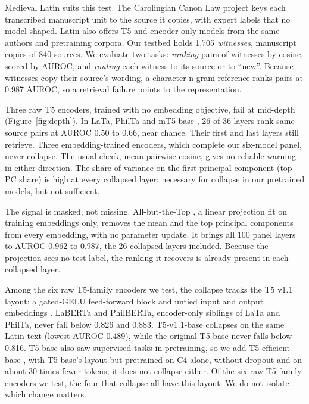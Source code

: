 \documentclass[11pt]{article}
\begin{document}
Medieval Latin suits this test.
The Carolingian Canon Law project \citep[CCL;][]{firey2009ccl} keys each transcribed manuscript unit to the source it copies, with expert labels that no model shaped.
Latin also offers T5 and encoder-only models from the same authors and pretraining corpora.
Our testbed holds 1,705 \emph{witnesses}, manuscript copies of 840 sources.
We evaluate two tasks: \emph{ranking} pairs of witnesses by cosine, scored by AUROC, and \emph{routing} each witness to its source or to ``new''.
Because witnesses copy their source's wording, a character n-gram reference ranks pairs at 0.987 AUROC, so a retrieval failure points to the representation.

Three raw T5 encoders, trained with no embedding objective, fail at mid-depth (Figure~\ref{fig:depth}).
In LaTa, PhilTa and mT5-base \citep{xue2021mt5}, 26 of 36 layers rank same-source pairs at AUROC 0.50 to 0.66, near chance.
Their first and last layers still retrieve.
Three embedding-trained encoders, which complete our six-model panel, never collapse.
The usual check, mean pairwise cosine, gives no reliable warning in either direction.
The share of variance on the first principal component (top-PC share) is high at every collapsed layer: necessary for collapse in our pretrained models, but not sufficient.

The signal is masked, not missing.
All-but-the-Top \citep[ABTT;][]{mu2018allbutthetop}, a linear projection fit on training embeddings only, removes the mean and the top principal components from every embedding, with no parameter update.
It brings all 100 panel layers to AUROC 0.962 to 0.987, the 26 collapsed layers included.
Because the projection sees no test label, the ranking it recovers is already present in each collapsed layer.

Among the six raw T5-family encoders we test, the collapse tracks the T5 v1.1 layout: a gated-GELU feed-forward block \citep{shazeer2020glu} and untied input and output embeddings \citep{t5v11release}.
LaBERTa and PhilBERTa, encoder-only siblings of LaTa and PhilTa, never fall below 0.826 and 0.883.
T5-v1.1-base collapses on the same Latin text (lowest AUROC 0.489), while the original T5-base \citep{raffel2020t5} never falls below 0.816.
T5-base also saw supervised tasks in pretraining, so we add T5-efficient-base \citep{tay2022scale}, with T5-base's layout but pretrained on C4 alone, without dropout and on about 30 times fewer tokens; it does not collapse either.
Of the six raw T5-family encoders we test, the four that collapse all have this layout.
We do not isolate which change matters.
\end{document}
